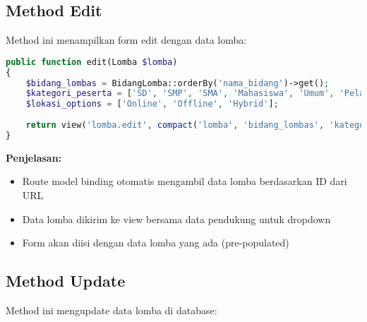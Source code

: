 \documentclass[12pt,a4paper]{article}
\begin{document}
\subsection{Method Edit}

Method ini menampilkan form edit dengan data lomba:

\begin{lstlisting}[language=PHP]
public function edit(Lomba $lomba)
{
    $bidang_lombas = BidangLomba::orderBy('nama_bidang')->get();
    $kategori_peserta = ['SD', 'SMP', 'SMA', 'Mahasiswa', 'Umum', 'Pelajar'];
    $lokasi_options = ['Online', 'Offline', 'Hybrid'];
    
    return view('lomba.edit', compact('lomba', 'bidang_lombas', 'kategori_peserta', 'lokasi_options'));
}
\end{lstlisting}

\textbf{Penjelasan:}
\begin{itemize}
    \item Route model binding otomatis mengambil data lomba berdasarkan ID dari URL
    \item Data lomba dikirim ke view bersama data pendukung untuk dropdown
    \item Form akan diisi dengan data lomba yang ada (pre-populated)
\end{itemize}

\subsection{Method Update}

Method ini mengupdate data lomba di database:
\end{document}
